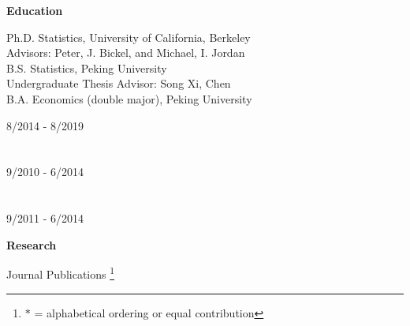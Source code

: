 \documentclass{article}
\begin{document}
\vspace{5mm}
\begin{large}
\noindent \textbf{Education}
\end{large}
\vspace{5mm}

\begin{minipage}{0.65\linewidth}
\noindent Ph.D. Statistics, University of California, Berkeley\\
Advisors: Peter, J. Bickel, and Michael, I. Jordan\\

\noindent B.S. Statistics, Peking University\\
Undergraduate Thesis Advisor: Song Xi, Chen\\

\noindent B.A. Economics (double major), Peking University

\end{minipage}\hfill
\begin{minipage}{0.34\linewidth}
\flushright
\vspace{-1mm}
8/2014 - 8/2019 \\
~\\
~\\
9/2010 - 6/2014\\
~\\
~\\
9/2011 - 6/2014\\
\end{minipage}

\vspace{5mm}
\begin{large}
\noindent \textbf{Research}
\end{large}
\vspace{5mm}


\begin{large}
\noindent Journal Publications \footnote{$\ast$ = alphabetical ordering or equal contribution}
\end{large}
\end{document}

